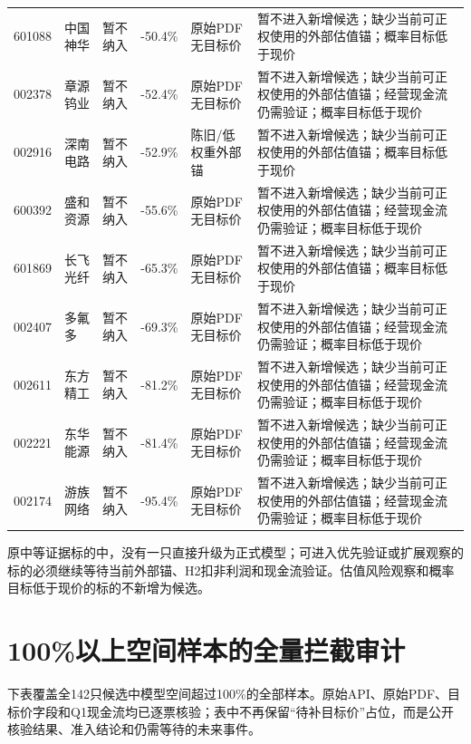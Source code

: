 \begin{longtable}{L{1.0cm}L{1.55cm}L{2.1cm}R{1.0cm}L{2.4cm}L{5.3cm}}
601088 & 中国神华 & 暂不纳入 & -50.4\% & 原始PDF无目标价 & 暂不进入新增候选；缺少当前可正权使用的外部估值锚；概率目标低于现价 \\
002378 & 章源钨业 & 暂不纳入 & -52.4\% & 原始PDF无目标价 & 暂不进入新增候选；缺少当前可正权使用的外部估值锚；经营现金流仍需验证；概率目标低于现价 \\
002916 & 深南电路 & 暂不纳入 & -52.9\% & 陈旧/低权重外部锚 & 暂不进入新增候选；缺少当前可正权使用的外部估值锚；概率目标低于现价 \\
600392 & 盛和资源 & 暂不纳入 & -55.6\% & 原始PDF无目标价 & 暂不进入新增候选；缺少当前可正权使用的外部估值锚；经营现金流仍需验证；概率目标低于现价 \\
601869 & 长飞光纤 & 暂不纳入 & -65.3\% & 原始PDF无目标价 & 暂不进入新增候选；缺少当前可正权使用的外部估值锚；概率目标低于现价 \\
002407 & 多氟多 & 暂不纳入 & -69.3\% & 原始PDF无目标价 & 暂不进入新增候选；缺少当前可正权使用的外部估值锚；经营现金流仍需验证；概率目标低于现价 \\
002611 & 东方精工 & 暂不纳入 & -81.2\% & 原始PDF无目标价 & 暂不进入新增候选；缺少当前可正权使用的外部估值锚；经营现金流仍需验证；概率目标低于现价 \\
002221 & 东华能源 & 暂不纳入 & -81.4\% & 原始PDF无目标价 & 暂不进入新增候选；缺少当前可正权使用的外部估值锚；经营现金流仍需验证；概率目标低于现价 \\
002174 & 游族网络 & 暂不纳入 & -95.4\% & 原始PDF无目标价 & 暂不进入新增候选；缺少当前可正权使用的外部估值锚；经营现金流仍需验证；概率目标低于现价 \\
\bottomrule
\end{longtable}
\normalsize

\begin{sourcequalitybox}[准入结论]
原中等证据标的中，没有一只直接升级为正式模型；可进入优先验证或扩展观察的标的必须继续等待当前外部锚、H2扣非利润和现金流验证。估值风险观察和概率目标低于现价的标的不新增为候选。
\end{sourcequalitybox}

\section{100\%以上空间样本的全量拦截审计}

下表覆盖全142只候选中模型空间超过100\%的全部样本。原始API、原始PDF、目标价字段和Q1现金流均已逐票核验；表中不再保留“待补目标价”占位，而是公开核验结果、准入结论和仍需等待的未来事件。

